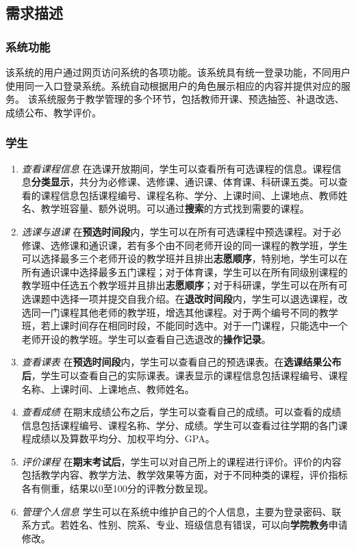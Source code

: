 \subsection{需求描述}

\subsubsection{系统功能}
\ttfamily
该系统的用户通过{\sffamily 网页}访问系统的各项功能。该系统具有{\sffamily 统一登录}功能，不同用户使用同一入口登录系统。系统自动根据用户的角色展示相应的内容并提供对应的服务。
该系统服务于教学管理的多个环节，包括教师开课、预选抽签、补退改选、成绩公布、教学评价。

\normalfont

\subsubsection{学生}
\begin{enumerate}
    \item \textit{查看课程信息} \quad 在选课开放期间，学生可以查看所有可选课程的信息。课程信息\textbf{分类显示}，共分为必修课、选修课、通识课、体育课、科研课五类。可以查看的课程信息包括课程编号、课程名称、学分、上课时间、上课地点、教师姓名、教学班容量、额外说明。可以通过\textbf{搜索}的方式找到需要的课程。
    \item \textit{选课与退课} \quad 在\textbf{预选时间段}内，学生可以在所有可选课程中预选课程。对于必修课、选修课和通识课，若有多个由不同老师开设的同一课程的教学班，学生可以选择最多三个老师开设的教学班并且排出\textbf{志愿顺序}，特别地，学生可以在所有通识课中选择最多五门课程；对于体育课，学生可以在所有同级别课程的教学班中任选五个教学班并且排出\textbf{志愿顺序}；对于科研课，学生可以在所有可选课题中选择一项并提交自我介绍。在\textbf{退改时间段}内，学生可以退选课程，改选同一门课程其他老师的教学班，增选其他课程。对于两个编号不同的教学班，若上课时间存在相同时段，不能同时选中。对于一门课程，只能选中一个老师开设的教学班。学生可以查看自己选退改的\textbf{操作记录}。
    \item \textit{查看课表} \quad 在\textbf{预选时间段}内，学生可以查看自己的预选课表。在\textbf{选课结果公布后}，学生可以查看自己的实际课表。课表显示的课程信息包括课程编号、课程名称、上课时间、上课地点、教师姓名。
    \item \textit{查看成绩} \quad 在期末成绩公布之后，学生可以查看自己的成绩。可以查看的成绩信息包括课程编号、课程名称、学分、成绩。学生可以查看过往学期的各门课程成绩以及算数平均分、加权平均分、GPA。
    \item \textit{评价课程} \quad 在\textbf{期末考试后}，学生可以对自己所上的课程进行评价。评价的内容包括教学内容、教学方法、教学效果等方面，对于不同种类的课程，评价指标各有侧重，结果以0至100分的评教分数呈现。
    \item \textit{管理个人信息} \quad 学生可以在系统中维护自己的个人信息，主要为登录密码、联系方式。若姓名、性别、院系、专业、班级信息有错误，可以向\textbf{学院教务}申请修改。
\end{enumerate}

